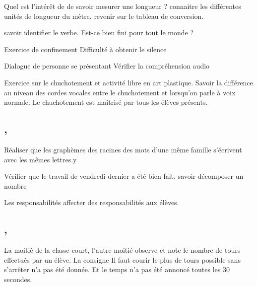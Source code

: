 \documentclass{article}
\begin{document}
	\dis\cma{} Quel est l’intérêt de de savoir mesurer une longueur ?
	\obj connaitre les différentes unités de longueur du mètre.
	\bil revenir sur le tableau de conversion.
	
	\dis\cfr{}
	\obj savoir identifier le verbe.
	\bil Est-ce bien fini pour tout le monde ?

	\dIs\cge{} Exercice de confinement
	\bil Difficulté à obtenir le silence
	
	\dIs\cen{} Dialogue de personne se présentant
	\obj Vérifier la compréhension audio
	
	
	\dIs\car{} Exercice sur le chuchotement et activité libre en art plastique.
	\obj Savoir la différence au niveau des cordes vocales entre le chuchotement et lorsqu’on parle à voix normale.
	\bil Le chuchotement est maitrisé par tous les élèves présents.
	
	
	\subsection{ \sep}
	\dis\cfr{}
	\obj Réaliser que les graphèmes des racines des mots d’une même famille s’écrivent avec les mêmes lettres.y
	
	\dis\cma{} Vérifier que le travail de vendredi dernier a été bien fait.
	\obj savoir décomposer un nombre

	\dIs\cge{} Les responsabilités
	\obj affecter des responsabilités aux élèves.
	
	
	\subsection{ \sep}
	\Dis\csp{} La moitié de la classe court, l'autre moitié observe et note le nombre de tours effectués par un élève.
	\bil La consigne \og Il faut courir le plus de tours possible sans s'arrêter \fg{} n’a pas été donnée. Et le temps n’a pas été annoncé toutes les 30 secondes.
	
\end{document}
